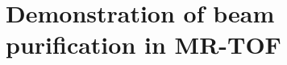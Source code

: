 \documentclass[jon_ringuette_thesis.tex]{subfiles}
\begin{document}
\chapter{Demonstration of beam purification in MR-TOF}
\end{document}

